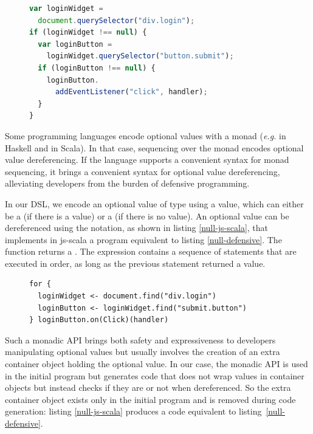 \documentclass[preprint]{sigplanconf}
\newcommand{\eg}{\emph{e.g.}}
\begin{document}
\begin{figure}[htb]
\begin{lstlisting}[language=JavaScript,label=null-defensive,caption=Defensive programming to handle
null references]
var loginWidget =
  document.querySelector("div.login");
if (loginWidget !== null) {
  var loginButton =
    loginWidget.querySelector("button.submit");
  if (loginButton !== null) {
    loginButton.
      addEventListener("click", handler);
  }
}
\end{lstlisting}
\end{figure}

Some programming languages encode optional values with a monad (\eg{}  in Haskell and
 in Scala). In that case, sequencing over the monad encodes optional value
dereferencing. If the language supports a convenient syntax for monad sequencing, it brings a
convenient syntax for optional value dereferencing, alleviating developers from the burden of
defensive programming.

In our DSL, we encode an optional value of type  using a  value,
which can either be a  (if there is a value) or a  (if
there is no value). An optional value can be dereferenced using the  notation, as shown
in listing \ref{null-js-scala}, that implements in js-scala a program equivalent to listing
\ref{null-defensive}. The  function returns a . The 
expression contains a sequence of statements that are executed in order, as long as the previous
statement returned a  value.

\begin{figure}[htb]
\begin{lstlisting}[label=null-js-scala,caption=Handling null references in js-scala]
for {
  loginWidget <- document.find("div.login")
  loginButton <- loginWidget.find("submit.button")
} loginButton.on(Click)(handler)
\end{lstlisting}
\end{figure}

Such a monadic API brings both safety and expressiveness to developers manipulating optional values
but usually involves the creation of an extra container object holding the optional value. In our
case, the monadic API is used in the initial program but generates code that does not wrap values in
container objects but instead checks if they are  or not when dereferenced. So the extra
container object exists only in the initial program and is removed during code generation: listing
\ref{null-js-scala} produces a code equivalent to listing~\ref{null-defensive}.
\end{document}
